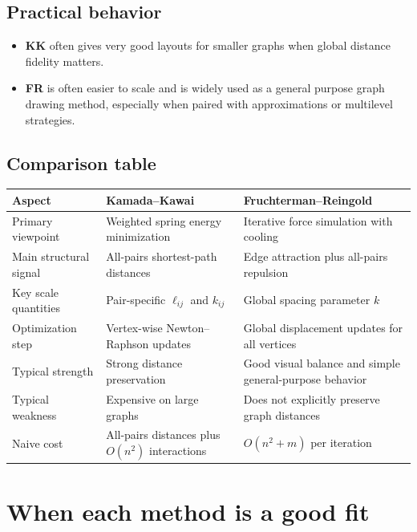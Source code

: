 \documentclass[11pt]{article}
\begin{document}
\subsection{Practical behavior}

\begin{itemize}[leftmargin=1.5em]
\item \textbf{KK} often gives very good layouts for smaller graphs when global
distance fidelity matters.
\item \textbf{FR} is often easier to scale and is widely used as a general
purpose graph drawing method, especially when paired with approximations or
multilevel strategies.
\end{itemize}

\subsection{Comparison table}

\begin{center}
\small
\begin{tabular}{>{\raggedright\arraybackslash}p{} >{\raggedright\arraybackslash}p{} >{\raggedright\arraybackslash}p{}}
\toprule
\textbf{Aspect} & \textbf{Kamada--Kawai} & \textbf{Fruchterman--Reingold} \\
\midrule
Primary viewpoint & Weighted spring energy minimization & Iterative force simulation with cooling \\
Main structural signal & All-pairs shortest-path distances & Edge attraction plus all-pairs repulsion \\
Key scale quantities & Pair-specific $\ell_{ij}$ and $k_{ij}$ & Global spacing parameter $k$ \\
Optimization step & Vertex-wise Newton--Raphson updates & Global displacement updates for all vertices \\
Typical strength & Strong distance preservation & Good visual balance and simple general-purpose behavior \\
Typical weakness & Expensive on large graphs & Does not explicitly preserve graph distances \\
Naive cost & All-pairs distances plus $O(n^2)$ interactions & $O(n^2 + m)$ per iteration \\
\bottomrule
\end{tabular}
\end{center}

\section{When each method is a good fit}
\end{document}
